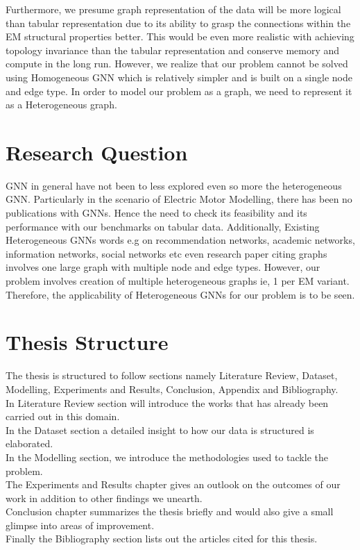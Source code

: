 \documentclass{report} %
\begin{document}
Furthermore, we presume graph representation of the data will be more logical than tabular representation due to its ability to grasp the connections within the \ac{EM} structural properties better.
This would be even more realistic with achieving topology invariance than the tabular representation and conserve memory and compute in the long run.
However, we realize that our problem cannot be solved using Homogeneous \ac{GNN} which is relatively simpler and is built on a single node and edge type.
In order to model our problem as a graph, we need to represent it as a Heterogeneous graph. \\

\section{Research Question}\label{sec:Research Question}
\ac{GNN} in general have not been to less explored even so more the heterogeneous \ac{GNN}.
Particularly in the scenario of Electric Motor Modelling, there has been no publications with \ac{GNN}s.
Hence the need to check its feasibility and its performance with our benchmarks on tabular data.
Additionally, Existing Heterogeneous \ac{GNN}s words e.g on recommendation networks, academic networks, information networks, social networks etc even research paper citing graphs involves one large graph with multiple node and edge types. 
However, our problem involves creation of multiple heterogeneous graphs ie, 1 per \ac{EM} variant.\\
Therefore, the applicability of Heterogeneous \ac{GNN}s for our problem is to be seen.\\

\section{Thesis Structure}\label{sec:Thesis Structure}

The thesis is structured to follow sections namely Literature Review, Dataset, Modelling, Experiments and Results, Conclusion, Appendix and Bibliography.\\
In Literature Review section will introduce the works that has already been carried out in this domain. \\
In the Dataset section a detailed insight to how our data is structured is elaborated.\\
In the Modelling section, we introduce the methodologies used to tackle the problem. \\
The Experiments and Results chapter gives an outlook on the outcomes of our work in addition to other findings we unearth.\\ 
Conclusion chapter summarizes the thesis briefly and would also give a small glimpse into areas of improvement. \\
Finally the Bibliography section lists out the articles cited for this thesis.\\
\newpage 
\end{document}
